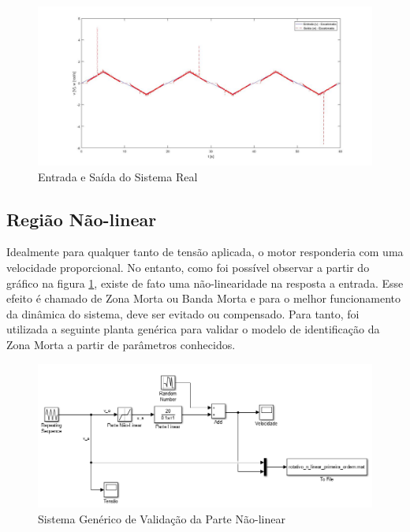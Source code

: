 \documentclass[a4paper,11pt]{article}
\begin{document}
\begin{figure}[H]
    \centering
    \includegraphics[width=1\linewidth]{tex/img/Entrada_e_Saida.jpg}
    \caption{Entrada e Saída do Sistema Real}
    \label{fig:entrada_saida_real}
\end{figure}





\subsection{Região Não-linear}
Idealmente para qualquer tanto de tensão aplicada, o motor responderia com uma velocidade proporcional. No entanto, como foi possível observar a partir do gráfico na figura \ref{fig:entrada_saida_real}, existe de fato uma não-linearidade na resposta a entrada. Esse efeito é chamado de Zona Morta ou Banda Morta e para o melhor funcionamento da dinâmica do sistema, deve ser evitado ou compensado. Para tanto, foi utilizada a seguinte planta genérica para validar o modelo de identificação da Zona Morta a partir de parâmetros conhecidos.

\begin{figure}[H]
    \centering
    \includegraphics[width=1.0\linewidth]{tex/img/Sistema_Generico.png}
    \caption{Sistema Genérico de Validação da Parte Não-linear}
    \label{fig:sistema_generico_nlinear}
\end{figure}
\end{document}
